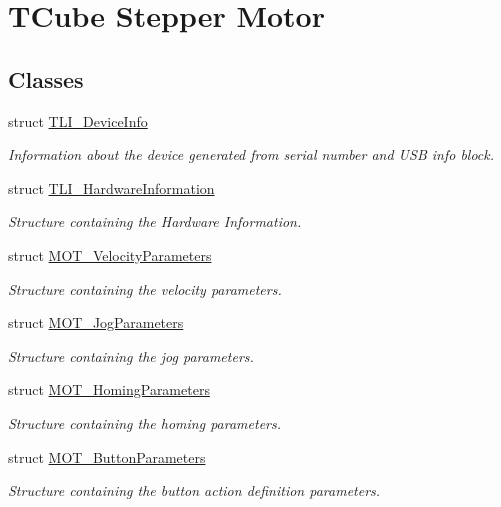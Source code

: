 \hypertarget{group___t_cube_stepper}{}\section{T\+Cube Stepper Motor}
\label{group___t_cube_stepper}
\subsection*{Classes}
\begin{DoxyCompactItemize}
\item 
struct \hyperlink{struct_t_l_i___device_info}{T\+L\+I\+\_\+\+Device\+Info}
\begin{DoxyCompactList}\small\item\em Information about the device generated from serial number and U\+SB info block. \end{DoxyCompactList}\item 
struct \hyperlink{struct_t_l_i___hardware_information}{T\+L\+I\+\_\+\+Hardware\+Information}
\begin{DoxyCompactList}\small\item\em Structure containing the Hardware Information. \end{DoxyCompactList}\item 
struct \hyperlink{struct_m_o_t___velocity_parameters}{M\+O\+T\+\_\+\+Velocity\+Parameters}
\begin{DoxyCompactList}\small\item\em Structure containing the velocity parameters. \end{DoxyCompactList}\item 
struct \hyperlink{struct_m_o_t___jog_parameters}{M\+O\+T\+\_\+\+Jog\+Parameters}
\begin{DoxyCompactList}\small\item\em Structure containing the jog parameters. \end{DoxyCompactList}\item 
struct \hyperlink{struct_m_o_t___homing_parameters}{M\+O\+T\+\_\+\+Homing\+Parameters}
\begin{DoxyCompactList}\small\item\em Structure containing the homing parameters. \end{DoxyCompactList}\item 
struct \hyperlink{struct_m_o_t___button_parameters}{M\+O\+T\+\_\+\+Button\+Parameters}
\begin{DoxyCompactList}\small\item\em Structure containing the button action definition parameters. \end{DoxyCompactList}\item 

\end{DoxyCompactItemize}
